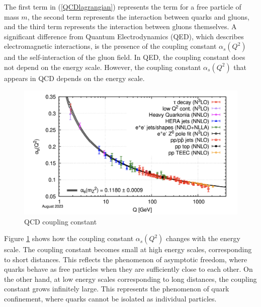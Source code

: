         The first term in (\ref{QCDlagrangian}) represents the term for a free particle of mass $m$, the second term represents the interaction between quarks and gluons, and the third term represents the interaction between gluons themselves. A significant difference from Quantum Electrodynamics (QED), which describes electromagnetic interactions, is the presence of the coupling constant $\alpha_s(Q^2)$ and the self-interaction of the gluon field. In QED, the coupling constant does not depend on the energy scale. However, the coupling constant $\alpha_s(Q^2)$ that appears in QCD depends on the energy scale.
        \begin{figure}[htbp]
            \centering
            \includegraphics[keepaspectratio, scale=0.6]{fig/1_1_coupling_constant.png}
            \caption{QCD coupling constant\cite{ParticleDataGroup:2024cfk}}
            \label{coupling_constant}
        \end{figure}
        Figure \ref{coupling_constant} shows how the coupling constant $\alpha_s(Q^2)$ changes with the energy scale. The coupling constant becomes small at high energy scales, corresponding to short distances. This reflects the phenomenon of asymptotic freedom, where quarks behave as free particles when they are sufficiently close to each other. On the other hand, at low energy scales corresponding to long distances, the coupling constant grows infinitely large. This represents the phenomenon of quark confinement, where quarks cannot be isolated as individual particles.
        
